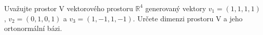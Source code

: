 \subsubsection{}
Uvažujte prostor V vektorového prostoru $\mathbb{R}^{4}$ generovaný vektory
$v_{1}=(1,1,1,1)$, $v_{2}=(0,1,0,1)$ a $v_{3}=(1,-1,1,-1)$. Určete dimenzi
prostoru V a jeho ortonormální bázi.
